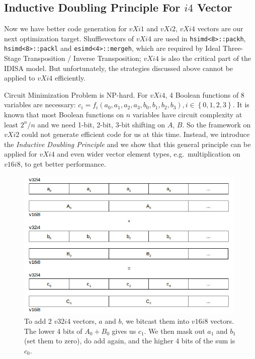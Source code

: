 \subsection{Inductive Doubling Principle For $i4$ Vector}
Now we have better code generation for $vXi1$ and $vXi2$, $vXi4$ vectors are our next optimization target. Shufflevectors of $vXi4$ are used in \verb|hsimd<8>::packh|, \verb|hsimd<8>::packl| and \verb|esimd<4>::mergeh|, which are required by Ideal Three-Stage Transposition / Inverse Transposition; $vXi4$ is also the critical part of the IDISA model. But unfortunately, the strategies discussed above cannot be applied to $vXi4$ efficiently.

Circuit Minimization Problem is NP-hard\cite{quine1952problem, kabanets2000circuit}. For $vXi4$, 4 Boolean functions of 8 variables are necessary: $c_i = f_i(a_0, a_1, a_2, a_3, b_0, b_1, b_2, b_3), i \in \left\{{0, 1, 2, 3}\right\}$. It is known that most Boolean functions on $n$ variables have circuit complexity at least $2^n/n$\cite{kabanets2000circuit} and we need 1-bit, 2-bit, 3-bit shifting on $A$, $B$. So the framework on $vXi2$ could not generate efficient code for us at this time. Instead, we introduce the \textit{Inductive Doubling Principle} \cite{inductive_doubling_principle} and we show that this general principle can be applied for $vXi4$ and even wider vector element types, e.g.\ multiplication on $v16i8$, to get better performance.

\begin{figure}[ht!]
\centering
\includegraphics[width=110mm]{draw/add_4.png}
\caption[Addition of two $v32i4$ vectors.]{To add 2 $v32i4$ vectors, $a$ and $b$, we bitcast them into $v16i8$ vectors. The lower 4 bits of $A_0 + B_0$ gives us $c_1$. We then mask out $a_1$ and $b_1$ (set them to zero), do add again, and the higher 4 bits of the sum is $c_0$.}
\label{figure:add_4}
\end{figure}

